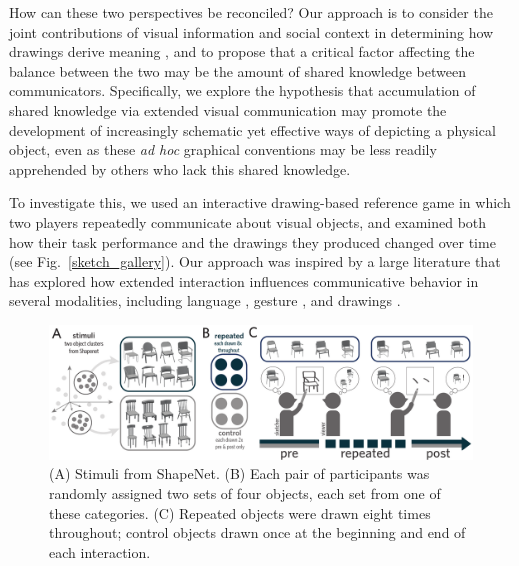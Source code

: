 \documentclass[10pt,letterpaper]{article}
\begin{document}
How can these two perspectives be reconciled?
Our approach is to consider the joint contributions of visual information and social context in determining how drawings derive meaning \cite{abell2009canny}, and to propose that a critical factor affecting the balance between the two may be the amount of shared knowledge between communicators.
Specifically, we explore the hypothesis that accumulation of shared knowledge via extended visual communication may promote the development of increasingly schematic yet effective ways of depicting a physical object, even as these \textit{ad hoc} graphical conventions may be less readily apprehended by others who lack this shared knowledge.

To investigate this, we used an interactive drawing-based reference game in which two players repeatedly communicate about visual objects, and examined both how their task performance and the drawings they produced changed over time (see Fig.~\ref{sketch_gallery}).
Our approach was inspired by a large literature that has explored how extended interaction influences communicative behavior in several modalities, including language \cite{krauss1964changes,ClarkWilkesGibbs86_ReferringCollaborative,HawkinsFrankGoodman17_ConventionFormation}, gesture \cite{goldin1996silence,fay2014creating}, and drawings \cite{garrod_foundations_2007}. %

\begin{figure}
\begin{center}
\includegraphics[width=0.86\linewidth]{figures/task_stimuli.pdf}
\caption{(A) Stimuli from ShapeNet. (B) Each pair of participants was randomly assigned two sets of four objects, each set from one of these categories. (C) Repeated objects were drawn eight times throughout; control objects drawn once at the beginning and end of each interaction.}
\label{task_stimuli}
\vspace{-1em}
\end{center}
\end{figure}

\end{document}
